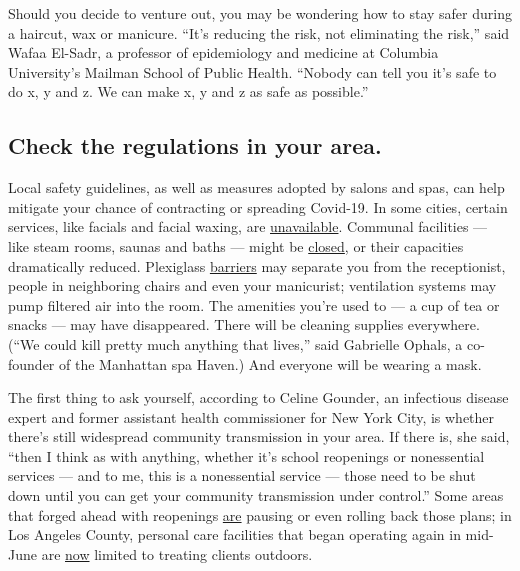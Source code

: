 Should you decide to venture out, you may be wondering how to stay safer
during a haircut, wax or manicure. ``It's reducing the risk, not
eliminating the risk,'' said Wafaa El-Sadr, a professor of epidemiology
and medicine at Columbia University's Mailman School of Public Health.
``Nobody can tell you it's safe to do x, y and z. We can make x, y and z
as safe as possible.''

\hypertarget{check-the-regulations-in-your-area}{%
\subsection{Check the regulations in your
area.}\label{check-the-regulations-in-your-area}}

Local safety guidelines, as well as measures adopted by salons and spas,
can help mitigate your chance of contracting or spreading Covid-19. In
some cities, certain services, like facials and facial waxing, are
\href{https://www.governor.ny.gov/sites/governor.ny.gov/files/atoms/files/Personal_Care_Summary_Guidelines.pdf}{unavailable}.
Communal facilities --- like steam rooms, saunas and baths --- might be
\href{https://www.northjersey.com/story/news/coronavirus/2020/06/12/nj-reopening-plan-spas-tanning-salons-can-reopen-june-22-murphy-says/3175833001/}{closed},
or their capacities dramatically reduced. Plexiglass
\href{https://www.cdc.gov/coronavirus/2019-ncov/community/organizations/nail-salon-employers.html}{barriers}
may separate you from the receptionist, people in neighboring chairs and
even your manicurist; ventilation systems may pump filtered air into the
room. The amenities you're used to --- a cup of tea or snacks --- may
have disappeared. There will be cleaning supplies everywhere. (``We
could kill pretty much anything that lives,'' said Gabrielle Ophals, a
co-founder of the Manhattan spa Haven.) And everyone will be wearing a
mask.

The first thing to ask yourself, according to Celine Gounder, an
infectious disease expert and former assistant health commissioner for
New York City, is whether there's still widespread community
transmission in your area. If there is, she said, ``then I think as with
anything, whether it's school reopenings or nonessential services ---
and to me, this is a nonessential service --- those need to be shut down
until you can get your community transmission under control.'' Some
areas that forged ahead with reopenings
\href{https://www.nytimes3xbfgragh.onion/interactive/2020/us/states-reopen-map-coronavirus.html}{are}
pausing or even rolling back those plans; in Los Angeles County,
personal care facilities that began operating again in mid-June are
\href{http://www.ph.lacounty.gov/media/Coronavirus/docs/protocols/Reopening_PersonalCare.pdf}{now}
limited to treating clients outdoors.

